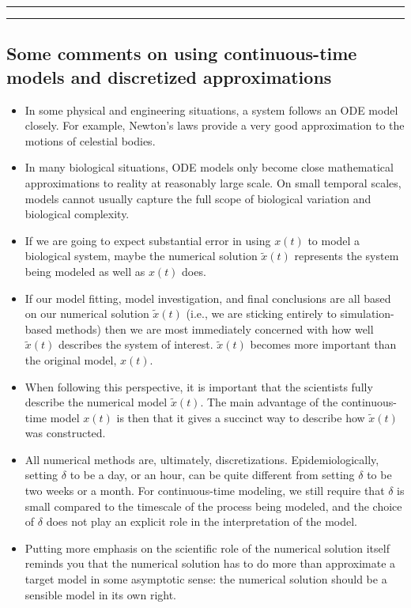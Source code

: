 \documentclass[]{article}
\begin{document}
\begin{center}\rule{0.5\linewidth}{\linethickness}\end{center}

\begin{center}\rule{0.5\linewidth}{\linethickness}\end{center}

\subsection{Some comments on using continuous-time models and
discretized
approximations}\label{some-comments-on-using-continuous-time-models-and-discretized-approximations}

\begin{itemize}
\item
  In some physical and engineering situations, a system follows an ODE
  model closely. For example, Newton's laws provide a very good
  approximation to the motions of celestial bodies.
\item
  In many biological situations, ODE models only become close
  mathematical approximations to reality at reasonably large scale. On
  small temporal scales, models cannot usually capture the full scope of
  biological variation and biological complexity.
\item
  If we are going to expect substantial error in using \(x(t)\) to model
  a biological system, maybe the numerical solution \(\tilde x(t)\)
  represents the system being modeled as well as \(x(t)\) does.
\item
  If our model fitting, model investigation, and final conclusions are
  all based on our numerical solution \(\tilde x(t)\) (i.e., we are
  sticking entirely to simulation-based methods) then we are most
  immediately concerned with how well \(\tilde x(t)\) describes the
  system of interest. \(\tilde x(t)\) becomes more important than the
  original model, \(x(t)\).
\item
  When following this perspective, it is important that the scientists
  fully describe the numerical model \(\tilde x(t)\). The main advantage
  of the continuous-time model \(x(t)\) is then that it gives a succinct
  way to describe how \(\tilde x(t)\) was constructed.
\item
  All numerical methods are, ultimately, discretizations.
  Epidemiologically, setting \(\delta\) to be a day, or an hour, can be
  quite different from setting \(\delta\) to be two weeks or a month.
  For continuous-time modeling, we still require that \(\delta\) is
  small compared to the timescale of the process being modeled, and the
  choice of \(\delta\) does not play an explicit role in the
  interpretation of the model.
\item
  Putting more emphasis on the scientific role of the numerical solution
  itself reminds you that the numerical solution has to do more than
  approximate a target model in some asymptotic sense: the numerical
  solution should be a sensible model in its own right.
\end{itemize}
\end{document}
